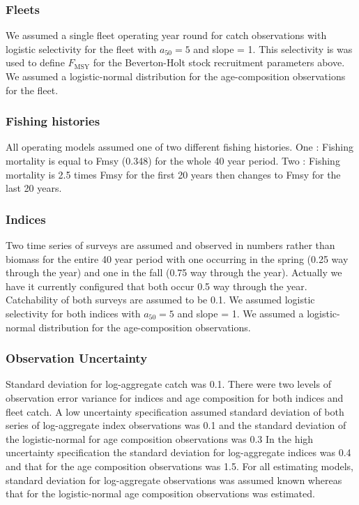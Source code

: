 \documentclass[
  12pt,
]{article}
\begin{document}
\hypertarget{fleets}{%
\subsubsection{Fleets}\label{fleets}}

We assumed a single fleet operating year round for catch observations
with logistic selectivity for the fleet with \(a_{50} = 5\) and slope =
1. This selectivity is was used to define \(F_{\text{MSY}}\) for the
Beverton-Holt stock recruitment parameters above. We assumed a
logistic-normal distribution for the age-composition observations for
the fleet.

\hypertarget{fishing-histories}{%
\subsubsection{Fishing histories}\label{fishing-histories}}

All operating models assumed one of two different fishing histories. One
: Fishing mortality is equal to Fmsy (0.348) for the whole 40 year
period. Two : Fishing mortality is 2.5 times Fmsy for the first 20 years
then changes to Fmsy for the last 20 years.

\hypertarget{indices}{%
\subsubsection{Indices}\label{indices}}

Two time series of surveys are assumed and observed in numbers rather
than biomass for the entire 40 year period with one occurring in the
spring (0.25 way through the year) and one in the fall (0.75 way through
the year). Actually we have it currently configured that both occur 0.5
way through the year. Catchability of both surveys are assumed to be
0.1. We assumed logistic selectivity for both indices with
\(a_{50} = 5\) and slope = 1. We assumed a logistic-normal distribution
for the age-composition observations.

\hypertarget{observation-uncertainty}{%
\subsubsection{Observation Uncertainty}\label{observation-uncertainty}}

Standard deviation for log-aggregate catch was 0.1. There were two
levels of observation error variance for indices and age composition for
both indices and fleet catch. A low uncertainty specification assumed
standard deviation of both series of log-aggregate index observations
was 0.1 and the standard deviation of the logistic-normal for age
composition observations was 0.3 In the high uncertainty specification
the standard deviation for log-aggregate indices was 0.4 and that for
the age composition observations was 1.5. For all estimating models,
standard deviation for log-aggregate observations was assumed known
whereas that for the logistic-normal age composition observations was
estimated.
\end{document}
